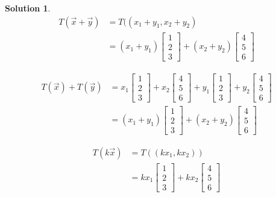 \documentclass{article}
\newtheorem*{solution}{Solution}
\begin{document}
\begin{solution}
\begin{align*}
T(\vec{x} + \vec{y}) &= T((x_{1} + y_{1}, x_{2} + y_{2}) \\
&= (x_{1} + y_{1}) \begin{bmatrix} 1 \\ 2 \\ 3 \end{bmatrix} + (x_{2} + y_{2}) \begin{bmatrix} 4 \\ 5 \\ 6 \end{bmatrix} 
\end{align*}

\begin{align*}
T(\vec{x}) + T(\vec{y}) &= x_{1} \begin{bmatrix}1 \\ 2 \\ 3 \end{bmatrix} + x_{2} \begin{bmatrix}4 \\ 5 \\ 6 \end{bmatrix} + y_{1} \begin{bmatrix}1 \\ 2 \\ 3 \end{bmatrix} + y_{2} \begin{bmatrix}4 \\ 5 \\ 6 \end{bmatrix} \\
&= (x_{1} + y_{1}) \begin{bmatrix} 1 \\ 2 \\ 3 \end{bmatrix} + (x_{2} + y_{2}) \begin{bmatrix} 4 \\ 5 \\ 6 \end{bmatrix} 
\end{align*}

\begin{align*}
T(k\vec{x}) &= T((kx_{1}, kx_{2})) \\
&= kx_{1} \begin{bmatrix} 1 \\ 2 \\ 3 \end{bmatrix} + kx_{2} \begin{bmatrix} 4 \\ 5 \\ 6 \end{bmatrix} 
\end{align*}


\end{solution}
\end{document}
